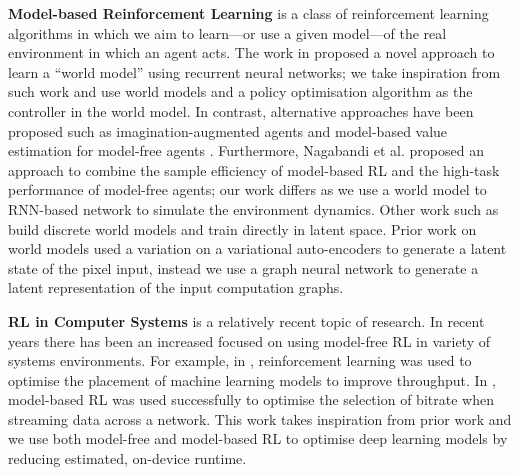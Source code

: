 

\textbf{Model-based Reinforcement Learning} is a class of reinforcement learning algorithms in which we aim to learn---or use a given model---of the real environment in which an agent acts. The work in \cite{ha2018worldmodels} proposed a novel approach to learn a ``world model'' using recurrent neural networks; we take inspiration from such work and use world models and a policy optimisation algorithm as the controller in the world model. In contrast, alternative approaches have been proposed such as imagination-augmented agents \cite{weber2018imaginationaugmented} and model-based value estimation for model-free agents \cite{feinberg2018modelbased}. Furthermore, Nagabandi et al. \cite{nagabandi2017neural} proposed an approach to combine the sample efficiency of model-based RL and the high-task performance of model-free agents; our work differs as we use a world model to RNN-based network to simulate the environment dynamics. Other work such as \cite{robine2021smaller, hafner2021mastering} build discrete world models and train directly in latent space. Prior work on world models used a variation on a variational auto-encoders \cite{ha2018worldmodels,hafner2020dream} to generate a latent state of the pixel input, instead we use a graph neural network \cite{battaglia2018relational} to generate a latent representation of the input computation graphs.

\textbf{RL in Computer Systems} is a relatively recent topic of research. In recent years there has been an increased focused on using model-free RL in variety of systems environments. For example, in \cite{mirhoseini2017device, mirhoseini2018hierarchical, addanki2019placeto, paliwal2020reinforced}, reinforcement learning was used to optimise the placement of machine learning models to improve throughput. In \cite{app10196685}, model-based RL was used successfully to optimise the selection of bitrate when streaming data across a network. This work takes inspiration from prior work and we use both model-free and model-based RL to optimise deep learning models by reducing estimated, on-device runtime.

